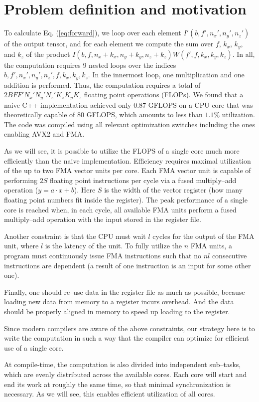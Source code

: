 \section{Problem definition and motivation}

  To calculate Eq. (\ref{eq:forward}), we loop over each element
  $I'(b,f',n_x',n_y',n_z')$ of the output tensor, and for each element
  we compute the sum over $f$, $k_x$, $k_y$, and $k_z$ of the product
  $I(b,f,n_x+k_x,n_y+k_y,n_z+k_z) W(f',f,k_x,k_y,k_z)$.  In all, the
  computation requires 9 nested loops over the indices
  $b,f',n_x',n_y',n_z',f,k_x,k_y,k_z$.  In the innermost loop, one
  multiplication and one addition is performed.  Thus, the computation
  requires a total of $2BFF'N_x'N_y'N_z'K_zK_yK_z$ floating point
  operations (FLOPs).  We found that a naive C++ implementation
  achieved only $0.87$ GFLOPS on a CPU core that was theoretically
  capable of $80$ GFLOPS, which amounts to less than $1.1\%$
  utilization.  The code was compiled using all relevant optimization
  switches including the ones enabling AVX2 and FMA.

  As we will see, it is possible to utilize the FLOPS of a single core
  much more efficiently than the naive implementation.  Efficiency
  requires maximal utilization of the up to two FMA vector units per
  core.  Each FMA vector unit is capable of performing $2S$ floating
  point instructions per cycle via a fused multiply--add operation ($y
  = a\cdot x + b$).  Here $S$ is the width of the vector register (how
  many floating point numbers fit inside the register).  The peak
  performance of a single core is reached when, in each cycle, all
  available FMA units perform a fused multiply--add operation with the
  input stored in the register file.

  Another constraint is that the CPU must wait $l$ cycles for the
  output of the FMA unit, where $l$ is the latency of the unit.  To
  fully utilize the $n$ FMA units, a program must continuously issue
  FMA instructions such that no $nl$ consecutive instructions are
  dependent (a result of one instruction is an input for some other
  one).

  Finally, one should re--use data in the register file as much as
  possible, because loading new data from memory to a register incurs
  overhead.  And the data should be properly aligned in memory to
  speed up loading to the register.

  Since modern compilers are aware of the above constraints, our
  strategy here is to write the computation in such a way that the
  compiler can optimize for efficient use of a single core.

  At compile-time, the computation is also divided into independent
  sub--tasks, which are evenly distributed across the available
  cores. Each core will start and end its work at roughly the same
  time, so that minimal synchronization is necessary.  As we will see,
  this enables efficient utilization of all cores.


